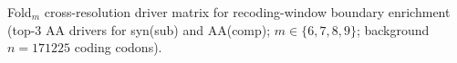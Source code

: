 Fold$_m$ cross-resolution driver matrix for recoding-window boundary enrichment (top-3 AA drivers for syn(sub) and AA(comp); $m\in\{6,7,8,9\}$; background $n=171225$ coding codons).
